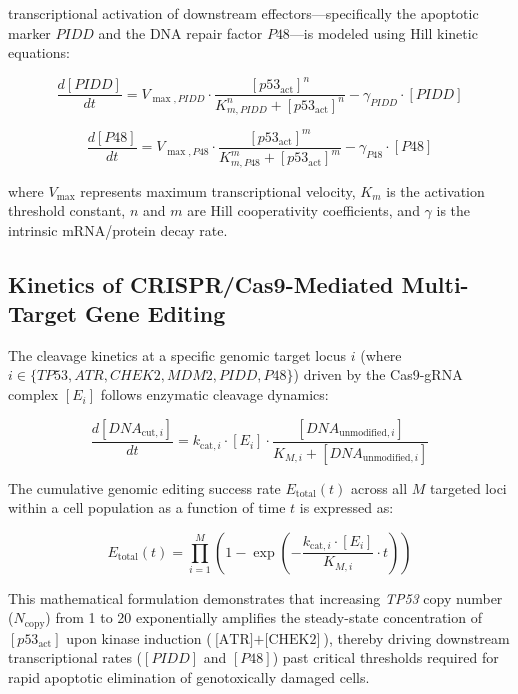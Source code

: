 \documentclass[11pt,a4paper]{article}
\begin{document}
 transcriptional activation of downstream effectors—specifically the apoptotic marker $PIDD$ and the DNA repair factor $P48$—is modeled using Hill kinetic equations:

\begin{equation}
\frac{d[PIDD]}{dt} = V_{\max, PIDD} \cdot \frac{[p53_{\text{act}}]^n}{K_{m, PIDD}^n + [p53_{\text{act}}]^n} - \gamma_{PIDD} \cdot [PIDD]
\end{equation}

\begin{equation}
\frac{d[P48]}{dt} = V_{\max, P48} \cdot \frac{[p53_{\text{act}}]^m}{K_{m, P48}^m + [p53_{\text{act}}]^m} - \gamma_{P48} \cdot [P48]
\end{equation}

where $V_{\max}$ represents maximum transcriptional velocity, $K_m$ is the activation threshold constant, $n$ and $m$ are Hill cooperativity coefficients, and $\gamma$ is the intrinsic mRNA/protein decay rate.

\subsection{Kinetics of CRISPR/Cas9-Mediated Multi-Target Gene Editing}

The cleavage kinetics at a specific genomic target locus $i$ (where $i \in \{\textit{TP53}, \textit{ATR}, \textit{CHEK2}, \textit{MDM2}, \textit{PIDD}, \textit{P48}\}$) driven by the Cas9-gRNA complex $[E_i]$ follows enzymatic cleavage dynamics:

\begin{equation}
\frac{d[DNA_{\text{cut}, i}]}{dt} = k_{\text{cat}, i} \cdot [E_i] \cdot \frac{[DNA_{\text{unmodified}, i}]}{K_{M, i} + [DNA_{\text{unmodified}, i}]}
\end{equation}

The cumulative genomic editing success rate $E_{\text{total}}(t)$ across all $M$ targeted loci within a cell population as a function of time $t$ is expressed as:

\begin{equation}
E_{\text{total}}(t) = \prod_{i=1}^{M} \left( 1 - \exp\left( -\frac{k_{\text{cat}, i} \cdot [E_i]}{K_{M, i}} \cdot t \right) \right)
\end{equation}

This mathematical formulation demonstrates that increasing \textit{TP53} copy number ($N_{\text{copy}}$) from 1 to 20 exponentially amplifies the steady-state concentration of $[p53_{\text{act}}]$ upon kinase induction ($\text{[ATR]} + \text{[CHEK2]}$), thereby driving downstream transcriptional rates ($[PIDD]$ and $[P48]$) past critical thresholds required for rapid apoptotic elimination of genotoxically damaged cells.
\end{document}
